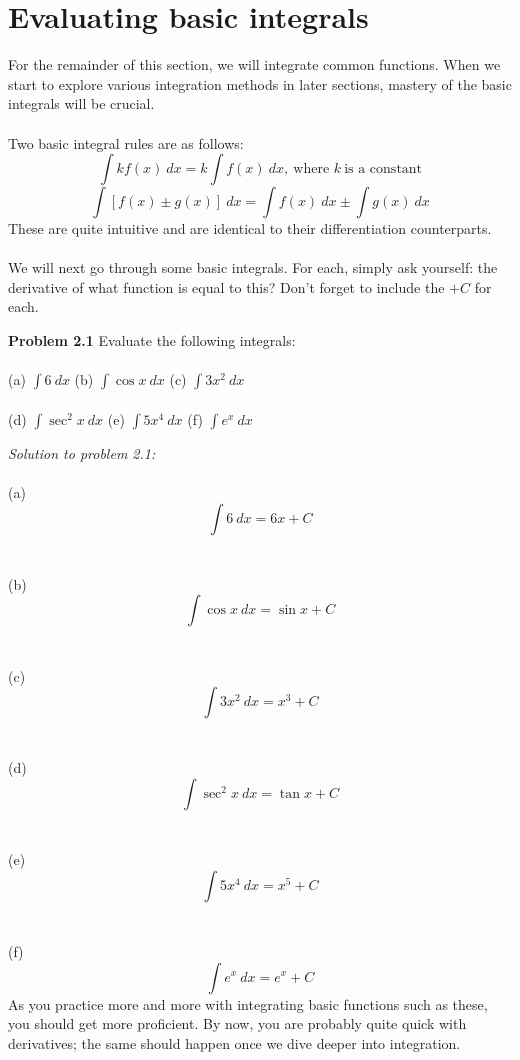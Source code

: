 \documentclass[11pt]{scrartcl}
\begin{document}
\section{Evaluating basic integrals}
\noindent 
For the remainder of this section, we will integrate common functions. When we start to explore various integration methods in later sections, mastery of the basic integrals will be crucial. \\
\\
\noindent 
Two basic integral rules are as follows: $$\int{kf(x) \ dx}=k\int{f(x) \ dx}, \ \text{where } k \ \text{is a constant}$$
$$\int[f(x)\pm g(x)] \ dx=\int{f(x) \ dx} \pm \int{g(x) \ dx}$$
\noindent 
These are quite intuitive and are identical to their differentiation counterparts. \\
\\
\noindent 
We will next go through some basic integrals. For each, simply ask yourself: the derivative of what function is equal to this? Don't forget to include the $+C$ for each. 
\begin{tcolorbox}[colback=purple!5!white,colframe=purple!75!black]
\textbf{Problem 2.1} Evaluate the following integrals: \\
\\
\noindent 
(a) \;\;$\int{6} \ dx$ \;\;\;\;\;\;\;\;\;\;\;\;\;\;\;\;(b) \;\;$\int{\cos x} \ dx$ \;\;\;\;\;\;\;\;\;\;\;\;\;\;\;\;(c) \;\;$\int{3x^2} \ dx$ \\
\\
\noindent 
(d) \;\;$\int \sec ^2 x \ dx$\;\;\;\;\;\;\;\;\; (e) \;\;$\int 5x^4 \ dx$ \;\;\;\;\;\;\;\;\;\;\;\;\;\;\;\;\; (f) \;\;$\int{e^x} \ dx$
\end{tcolorbox}
\noindent 
\textit{Solution to problem 2.1:} \\
\noindent 
\\
\noindent 
(a) $$\int{6} \ dx=6x+C$$ \\
\\
\noindent 
(b) $$\int{\cos x} \ dx=\sin x +C$$ \\
\\
\noindent
(c) $$\int{3x^2 \ dx}=x^3+C$$ \\
\\
\noindent 
(d) $$\int{\sec ^2 x \ dx}=\tan x +C$$\\
\\
\noindent
(e) $$\int{5x^4 \ dx}={x^5}+C$$ \\
\\
\noindent 
(f) $$\int{e^x \ dx}=e^x +C$$
\noindent 
As you practice more and more with integrating basic functions such as these, you should get more proficient. By now, you are probably quite quick with derivatives; the same should happen once we dive deeper into integration. 
\end{document}

